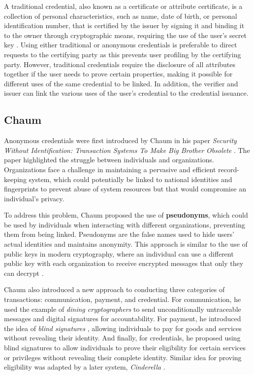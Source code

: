 A traditional credential, also known as a certificate or attribute certificate, is a collection of personal characteristics, such as name, date of birth, or personal identification number, that is certified by the issuer by signing it and binding it to the owner through cryptographic means, requiring the use of the user's secret key \cite{FISCHERHBNER2017759}. Using either traditional or anonymous credentials is preferable to direct requests to the certifying party as this prevents user profiling by the certifying party. However, traditional credentials require the disclosure of all attributes together if the user needs to prove certain properties, making it possible for different uses of the same credential to be linked. In addition, the verifier and issuer can link the various uses of the user's credential to the credential issuance.

\subsection*{Chaum}
Anonymous credentials were first introduced by Chaum in his paper \textit{Security Without Identification: Transaction Systems To Make Big Brother Obsolete} \cite{Chaum1985}. The paper highlighted the struggle between individuals and organizations. Organizations face a challenge in maintaining a pervasive and efficient record-keeping system, which could potentially be linked to national identities and fingerprints to prevent abuse of system resources but that would compromise an individual's privacy.

To address this problem, Chaum proposed the use of \textbf{pseudonyms}, which could be used by individuals when interacting with different organizations, preventing them from being linked. Pseudonyms are the false names used to hide users' actual identities and maintains anonymity. This approach is similar to the use of public keys in modern cryptography, where an individual can use a different public key with each organization to receive encrypted messages that only they can decrypt \cite{rsa}.

Chaum also introduced a new approach to conducting three categories of transactions: communication, payment, and credential. For communication, he used the example of \textit{dining cryptographers} \cite{dining} to send unconditionally untraceable messages and digital signatures for accountability. For payment, he introduced the idea of \textit{blind signatures} \cite{chaum1983blind}, allowing individuals to pay for goods and services without revealing their identity. And finally, for credentials, he proposed using blind signatures to allow individuals to prove their eligibility for certain services or privileges without revealing their complete identity. Similar idea for proving eligibility was adapted by a later system, \textit{Cinderella} \cite{cinderella}.


